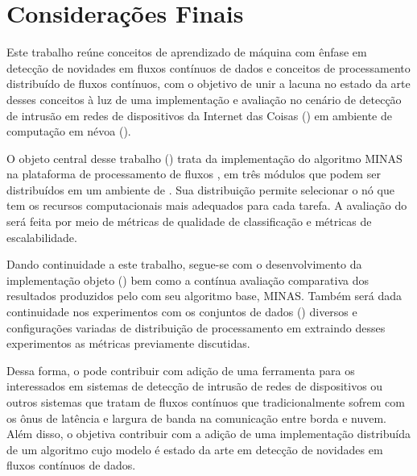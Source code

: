 
\chapter{Considerações Finais}\label{cha:final}


Este trabalho reúne conceitos de aprendizado de máquina com ênfase em detecção
de novidades em fluxos contínuos de dados e conceitos de processamento
distribuído de fluxos contínuos, com o objetivo de unir a lacuna no estado da
arte desses conceitos à luz de uma implementação e avaliação no cenário de
detecção de intrusão em redes de dispositivos da Internet das Coisas (\iot) em
ambiente de computação em névoa (\fog).

O objeto central desse trabalho (\mfog) trata da implementação do algoritmo MINAS na
plataforma de processamento de fluxos \flink, em três módulos que podem ser
distribuídos em um ambiente de \fog.
Sua distribuição permite selecionar o nó que tem os recursos computacionais mais
adequados para cada tarefa.
A avaliação do \mfog será feita por
meio de métricas de qualidade
de classificação e métricas de escalabilidade.

Dando continuidade a este trabalho, segue-se com o desenvolvimento da implementação objeto
(\mfog) bem como a contínua avaliação comparativa dos resultados
produzidos pelo \mfog com seu algoritmo base, MINAS.
Também será dada continuidade nos experimentos com os conjuntos de dados (\datasets)
diversos e configurações variadas de distribuição de processamento em \fog
extraindo desses experimentos as métricas previamente discutidas.

Dessa forma, o \mfog pode contribuir com adição de uma ferramenta para os interessados
em sistemas de detecção de intrusão de redes de dispositivos \iot
ou outros sistemas que tratam de fluxos contínuos que tradicionalmente sofrem
com os ônus de latência e largura de banda na comunicação entre borda e nuvem.
Além disso, o \mfog objetiva contribuir com a adição de uma implementação
distribuída de um algoritmo cujo modelo é estado da arte em detecção de
novidades em fluxos contínuos de dados.


